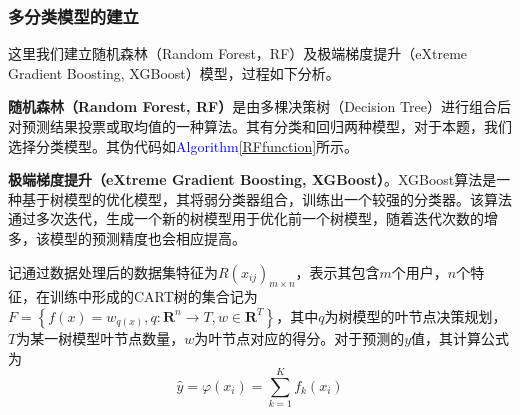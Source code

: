 \documentclass{MathorCupModeling}
\begin{document}
	\subsubsection{多分类模型的建立}\label{RF-XGBoost}
	这里我们建立随机森林（Random Forest，RF）及极端梯度提升（eXtreme Gradient Boosting, XGBoost）模型，过程如下分析。
	
	\textbf{随机森林（Random Forest, RF）}是由多棵决策树（Decision Tree）进行组合后对预测结果投票或取均值的一种算法\textcolor{blue}{\cite{Paper:随机森林}}。其有分类和回归两种模型，对于本题，我们选择分类模型。其伪代码如\textcolor{blue}{Algorithm\ref{RFfunction}}所示。
	

	\textbf{极端梯度提升（eXtreme Gradient Boosting, XGBoost）}。XGBoost算法是一种基于树模型的优化模型，其将弱分类器组合，训练出一个较强的分类器。该算法通过多次迭代，生成一个新的树模型用于优化前一个树模型，随着迭代次数的增多，该模型的预测精度也会相应提高\textcolor{blue}{\cite{pxgboost1}}。

		记通过数据处理后的数据集特征为$R\left(x_{ij}\right)_{m\times n}$，表示其包含$m$个用户，$n$个特征，在训练中形成的CART树的集合记为$F=\left\{f\left(x\right)=w_{q\left(x\right)},q:\mathbf{R}^n\to T,w\in \mathbf{R}^T\right\}$，其中$q$为树模型的叶节点决策规划，$T$为某一树模型叶节点数量，$w$为叶节点对应的得分\textcolor{blue}{\cite{pxgboost2}}。对于预测的$y$值，其计算公式为
		\begin{equation}
			\hat{y}=\varphi \left( x_i \right) =\sum\limits_{k=1}^K{f_k\left( x_i \right)} \label{fXGBoostypre}
		\end{equation}
	
\end{document}
